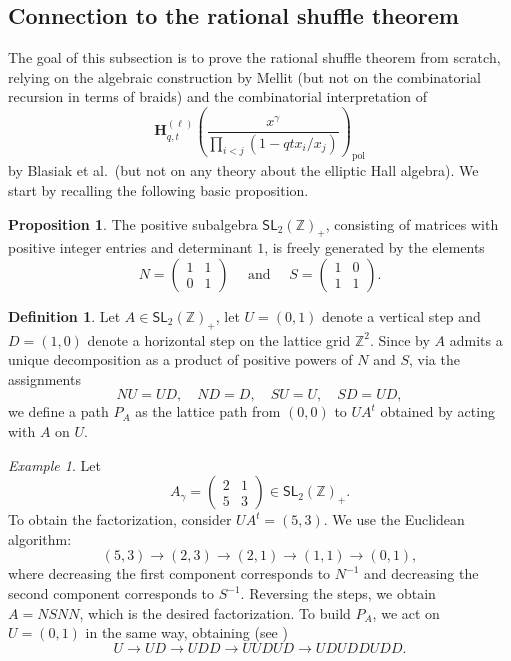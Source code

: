 \documentclass[reqno]{amsart}
\theoremstyle{plain}
\theoremstyle{definition}
\newtheorem{definition}[theorem]{Definition}
\newtheorem{proposition}[theorem]{Proposition}
\theoremstyle{remark}
\newtheorem{example}[theorem]{Example}
\newcommand{\<}{\langle}
\renewcommand{\>}{\rangle}
\begin{document}
\subsection{Connection to the rational shuffle theorem}
\label{section:D1}

The goal of this subsection is to prove the rational shuffle theorem from scratch, relying on the algebraic construction by Mellit \cite{Mellit2021Rational} (but not on the combinatorial recursion in terms of braids) and the combinatorial interpretation of
\[ \mathbf{H}_{q,t}^{(\ell)}\left(\frac{x^\gamma}{\prod_{i<j}(1-qt x_i/x_j)}\right)_{\mathrm{pol}} \]
by Blasiak et al.\ (but not on any theory about the elliptic Hall algebra).
We start by recalling the following basic proposition.

\begin{proposition}
    \label{prop:SL2}
    The positive subalgebra $\mathsf{SL}_2(\mathbb{Z})_+$, consisting of matrices with positive integer entries and determinant $1$, is freely generated by the elements \[ N = \begin{pmatrix} 1 & 1 \\ 0 & 1 \end{pmatrix} \quad \text{ and } \quad S = \begin{pmatrix} 1 & 0 \\ 1 & 1 \end{pmatrix}. \]
\end{proposition}

\begin{definition}
    \label{def:lowest_path}
    Let $A \in \mathsf{SL}_2(\mathbb{Z})_+$, let $U = (0,1)$ denote a vertical step and $D = (1,0)$ denote a horizontal step on the lattice grid $\mathbb{Z}^2$. Since by  $A$ admits a unique decomposition as a product of positive powers of $N$ and $S$, via the assignments
    \[ N U = U D, \quad N D = D, \quad S U = U, \quad SD = U D, \]
    we define a path $P_A$ as the lattice path from $(0,0)$ to $U A^t$ obtained by acting with $A$ on $U$.
\end{definition}

\begin{example}
    Let 
    \[ A_\gamma = \begin{pmatrix} 2 & 1 \\ 5 & 3 \end{pmatrix}  \in \mathsf{SL}_2(\mathbb{Z})_+. \]
    To obtain the factorization, consider $U A^t = (5,3)$. We use the Euclidean algorithm:
    \[ (5,3) \rightarrow (2,3) \rightarrow (2,1) \rightarrow (1,1) \rightarrow (0,1), \]
    where decreasing the first component corresponds to $N^{-1}$ and decreasing the second component corresponds to $S^{-1}$. Reversing the steps, we obtain $A = NSNN$, which is the desired factorization. To build $P_A$, we act on $U = (0,1)$ in the same way, obtaining (see )
    \[ U \rightarrow UD \rightarrow UDD \rightarrow UUDUD \rightarrow UDUDDUDD. \]
\end{example}
\end{document}
